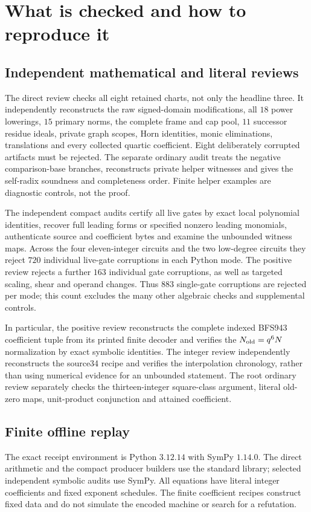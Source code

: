 \section{What is checked and how to reproduce it}
\subsection{Independent mathematical and literal reviews}
The direct review checks all eight retained charts, not only the headline
three. It independently reconstructs the raw signed-domain modifications,
all $18$ power lowerings, $15$ primary norms, the complete frame and cap pool,
$11$ successor residue ideals, private graph scopes, Horn identities,
monic eliminations, translations and every collected quartic coefficient.
Eight deliberately corrupted artifacts must be rejected. The separate
ordinary audit treats the negative comparison-base branches, reconstructs
private helper witnesses and gives the self-radix soundness and completeness
order. Finite helper examples are diagnostic controls, not the proof.

The independent compact audits certify all live gates by exact local
polynomial identities, recover full leading forms or specified nonzero
leading monomials, authenticate source and coefficient bytes and examine the
unbounded witness maps. Across the four eleven-integer circuits and the two
low-degree circuits they reject $720$ individual live-gate corruptions in
each Python mode. The positive review rejects a further $163$ individual
gate corruptions, as well as targeted scaling, shear and operand changes.
Thus $883$ single-gate corruptions are rejected per mode; this count excludes
the many other algebraic checks and supplemental controls.

In particular, the positive review reconstructs the complete indexed BFS943
coefficient tuple from its printed finite decoder and verifies the
$N_{\rm old}=q^6N$ normalization by exact symbolic identities.
The integer review independently reconstructs the source34 recipe and
verifies the interpolation chronology, rather than using numerical evidence
for an unbounded statement. The root ordinary review separately checks the
thirteen-integer square-class argument, literal old-zero maps, unit-product
conjunction and attained coefficient.

\subsection{Finite offline replay}
The exact receipt environment is Python $3.12.14$ with SymPy $1.14.0$.
The direct arithmetic and the compact producer builders use the standard
library; selected independent symbolic audits use SymPy. All equations have
literal integer coefficients and fixed exponent schedules. The finite
coefficient recipes construct fixed data and do not simulate the encoded
machine or search for a refutation.

